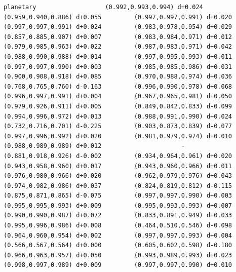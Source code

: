 \documentclass[11pt, letterpaper, openany]{book}
\begin{document}
\begin{empiricalbox}
\begin{lstlisting}[style=terminal]
planetary                   (0.992,0.993,0.994) d+0.024         (0.959,0.940,0.886) d+0.055         (0.997,0.997,0.991) d+0.020         (0.997,0.997,0.991) d+0.024         (0.983,0.978,0.954) d+0.029         (0.857,0.885,0.907) d+0.007         (0.983,0.984,0.971) d+0.012         (0.979,0.985,0.963) d+0.022         (0.987,0.983,0.971) d+0.042         (0.988,0.990,0.988) d+0.014         (0.997,0.995,0.993) d+0.011         (0.997,0.997,0.990) d+0.003         (0.985,0.985,0.986) d+0.031         (0.900,0.908,0.918) d+0.085         (0.970,0.988,0.974) d+0.036         (0.768,0.765,0.760) d-0.163         (0.996,0.990,0.978) d+0.068         (0.996,0.997,0.991) d+0.004         (0.967,0.965,0.981) d+0.050         (0.979,0.926,0.911) d+0.005         (0.849,0.842,0.833) d-0.099         (0.994,0.996,0.972) d+0.013         (0.988,0.991,0.990) d+0.024         (0.732,0.716,0.701) d-0.225         (0.903,0.873,0.839) d-0.077         (0.997,0.996,0.992) d+0.020         (0.981,0.979,0.974) d+0.010         (0.988,0.989,0.989) d+0.012                      -                      (0.881,0.918,0.926) d-0.002         (0.934,0.964,0.961) d+0.020         (0.943,0.958,0.960) d+0.017         (0.943,0.960,0.966) d+0.011         (0.976,0.980,0.966) d+0.020         (0.962,0.979,0.976) d+0.043         (0.974,0.982,0.986) d+0.037         (0.824,0.819,0.812) d-0.115         (0.875,0.871,0.865) d-0.075         (0.997,0.997,0.990) d+0.003         (0.995,0.995,0.993) d+0.009         (0.995,0.993,0.993) d+0.007         (0.990,0.990,0.987) d+0.072         (0.833,0.891,0.949) d+0.033         (0.995,0.996,0.986) d+0.008         (0.464,0.510,0.546) d-0.098         (0.964,0.960,0.954) d+0.002         (0.997,0.997,0.993) d+0.004         (0.566,0.567,0.564) d+0.000         (0.605,0.602,0.598) d-0.180         (0.966,0.963,0.957) d+0.050         (0.993,0.989,0.993) d+0.023         (0.998,0.997,0.989) d+0.009         (0.997,0.997,0.990) d+0.010     

\end{lstlisting}
\end{empiricalbox}
\end{document}
